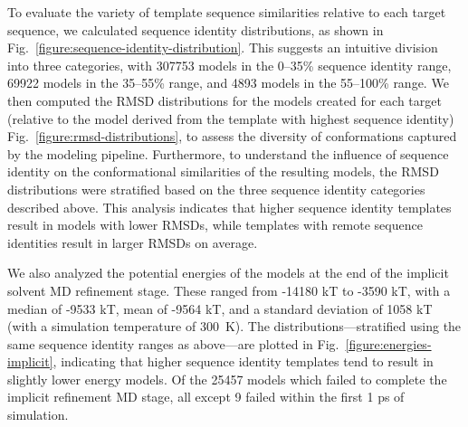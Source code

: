 \documentclass[aps,pre,twocolumn,nofootinbib,superscriptaddress,linenumbers]{revtex4-1}
\begin{document}
To evaluate the variety of template sequence similarities relative to each target sequence, we calculated sequence identity distributions, as shown in Fig.~\ref{figure:sequence-identity-distribution}.
This suggests an intuitive division into three categories, with \num{307753} models in the 0--35\% sequence identity range, \num{69922} models in the 35--55\% range, and \num{4893} models in the 55--100\% range.
We then computed the RMSD distributions for the models created for each target (relative to the model derived from the template with highest sequence identity) Fig.~\ref{figure:rmsd-distributions}, to assess the diversity of conformations captured by the modeling pipeline.
Furthermore, to understand the influence of sequence identity on the conformational similarities of the resulting models, the RMSD distributions were stratified based on the three sequence identity categories described above.
This analysis indicates that higher sequence identity templates result in models with lower RMSDs, while templates with remote sequence identities result in larger RMSDs on average.

We also analyzed the potential energies of the models at the end of the implicit solvent MD refinement stage.
These ranged from -14180 kT to -3590 kT, with a median of -9533 kT, mean of -9564 kT, and a standard deviation of 1058 kT (with a simulation temperature of 300~K).
The distributions---stratified using the same sequence identity ranges as above---are plotted in Fig.~\ref{figure:energies-implicit}, indicating that higher sequence identity templates tend to result in slightly lower energy models.
Of the \num{25457} models which failed to complete the implicit refinement MD stage, all except 9 failed within the first 1 ps of simulation.

\end{document}
